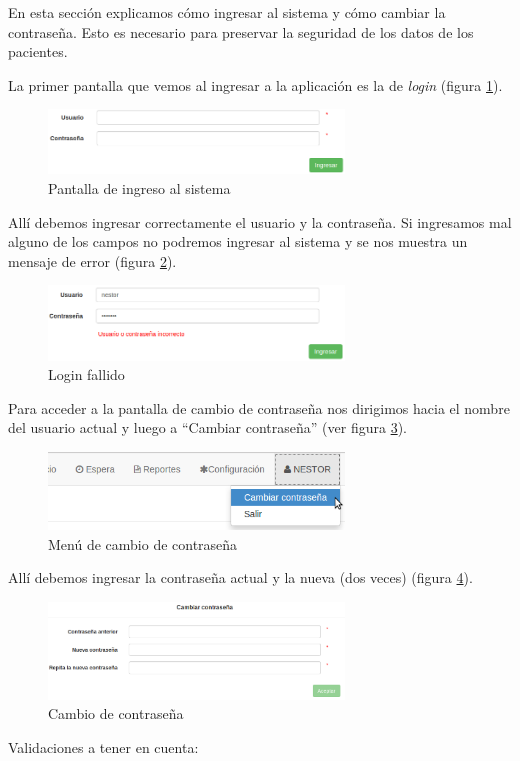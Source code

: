 En esta sección explicamos cómo ingresar al sistema y cómo cambiar la contraseña. Esto es necesario para preservar la seguridad de los datos  de los pacientes.

La primer pantalla que vemos al ingresar a la aplicación es la de \textit{login} (figura \ref{fig:login}).
\begin{figure}
\centerline{\includegraphics[width=0.7\textwidth]{login.png}}
\caption{Pantalla de ingreso al sistema}
\label{fig:login}
\end{figure}
Allí debemos ingresar correctamente el usuario y la contraseña. Si ingresamos mal alguno de los campos no podremos ingresar al sistema y se nos muestra un mensaje de error (figura \ref{fig:login_fallido}).
\begin{figure}
\centerline{\includegraphics[width=0.7\textwidth]{login_fallido.png}}
\caption{Login fallido}
\label{fig:login_fallido}
\end{figure}

\label{cap:cambio_pass}
Para acceder a la pantalla de cambio de contraseña nos dirigimos hacia el nombre del usuario actual y luego a ``Cambiar contraseña'' (ver figura \ref{fig:menu_cambio_pass}).
\begin{figure}
\centerline{\includegraphics[width=0.7\textwidth]{menu_cambio_pass.png}}
\caption{Menú de cambio de contraseña}
\label{fig:menu_cambio_pass}
\end{figure}
Allí debemos ingresar la contraseña actual y la nueva (dos veces) (figura \ref{fig:cambio_pass}).
\begin{figure}
\centerline{\includegraphics[width=0.7\textwidth]{cambio_pass.png}}
\caption{Cambio de contraseña}
\label{fig:cambio_pass}
\end{figure}
Validaciones a tener en cuenta:

